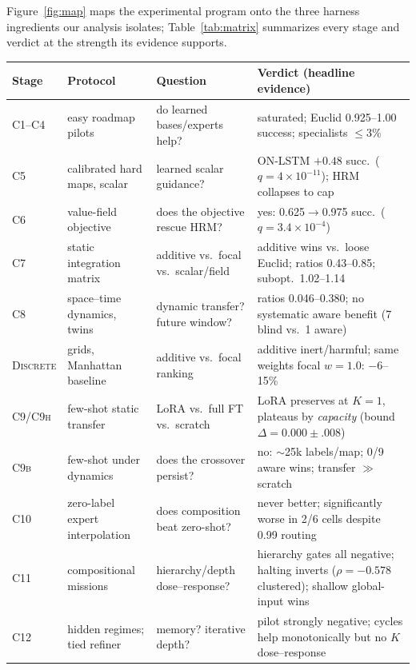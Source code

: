 \documentclass[letterpaper]{article} %
\newcommand{\stage}[1]{\textsc{#1}}
\begin{document}
Figure~\ref{fig:map} maps the experimental program onto the three harness ingredients our analysis isolates; Table~\ref{tab:matrix} summarizes every stage and verdict at the strength its evidence supports.

\begin{table}[t]
\centering
\footnotesize
\begin{tabular}{@{}p{1.5cm}p{3.3cm}p{3.6cm}p{8.0cm}@{}}
\toprule
Stage & Protocol & Question & Verdict (headline evidence) \\
\midrule
\stage{C1--C4} & easy roadmap pilots & do learned bases/experts help? & saturated; Euclid 0.925--1.00 success; specialists $\leq$3\% \\
\stage{C5} & calibrated hard maps, scalar & learned scalar guidance? & ON-LSTM $+0.48$ succ.\ ($q{=}4{\times}10^{-11}$); HRM collapses to cap \\
\stage{C6} & value-field objective & does the objective rescue HRM? & yes: 0.625$\to$0.975 succ.\ ($q{=}3.4{\times}10^{-4}$) \\
\stage{C7} & static integration matrix & additive vs.\ focal vs.\ scalar/field & additive wins vs.\ loose Euclid; ratios 0.43--0.85; subopt.\ 1.02--1.14 \\
\stage{C8} & space--time dynamics, twins & dynamic transfer? future window? & ratios 0.046--0.380; no systematic aware benefit (7 blind vs.\ 1 aware) \\
\stage{Discrete} & grids, Manhattan baseline & additive vs.\ focal ranking & additive inert/harmful; same weights focal $w{=}1.0$: $-$6--15\% \\
\stage{C9/C9h} & few-shot static transfer & LoRA vs.\ full FT vs.\ scratch & LoRA preserves at $K{=}1$, plateaus by \emph{capacity} (bound $\Delta{=}0.000{\pm}.008$) \\
\stage{C9b} & few-shot under dynamics & does the crossover persist? & no: $\sim$25k labels/map; 0/9 aware wins; transfer $\gg$ scratch \\
\stage{C10} & zero-label expert interpolation & does composition beat zero-shot? & never better; significantly worse in 2/6 cells despite 0.99 routing \\
\stage{C11} & compositional missions & hierarchy/depth dose--response? & hierarchy gates all negative; halting inverts ($\rho{=}-0.578$ clustered); shallow global-input wins \\
\stage{C12} & hidden regimes; tied refiner & memory? iterative depth? & pilot strongly negative; cycles help monotonically but no $K$ dose--response \\

\end{tabular}
\end{table}
\end{document}
